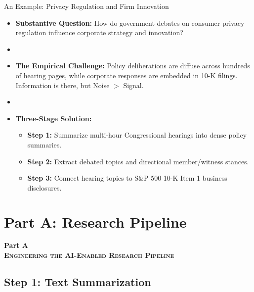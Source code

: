 \documentclass[xcolor=x11names,compress,9pt]{beamer}
\renewcommand{\(}{\begin{columns}}
\renewcommand{\)}{\end{columns}}
\newcommand{\<}[1]{\begin{column}{#1}}
\renewcommand{\>}{\end{column}}
\begin{document}
\begin{frame}{An Example: Privacy Regulation and Firm Innovation}
    \begin{itemize}
        \item \textbf{Substantive Question:} How do government debates on consumer privacy regulation influence corporate strategy and innovation?
        \item []
        \item \textbf{The Empirical Challenge:} Policy deliberations are diffuse across hundreds of hearing pages, while corporate responses are embedded in 10-K filings. Information is there, but Noise $>$ Signal.
        \item []
        \item \textbf{Three-Stage Solution:}
        \begin{itemize}
            \item \textbf{Step 1:} Summarize multi-hour Congressional hearings into dense policy summaries.
            \item \textbf{Step 2:} Extract debated topics and directional member/witness stances.
            \item \textbf{Step 3:} Connect hearing topics to S\&P 500 10-K Item 1 business disclosures.
        \end{itemize}
    \end{itemize}
\end{frame}

\section{Part A: Research Pipeline}

\begin{frame}
    \centering
    \vfill
    \Huge\bfseries Part A \\ 
    \vspace{0.4cm}
    \large\scshape Engineering the AI-Enabled Research Pipeline
    \vfill
\end{frame}

\subsection{Step 1: Text Summarization}
\end{document}
